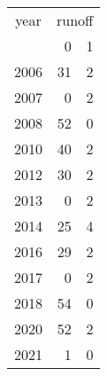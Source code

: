 \footnotesize\begin{tabular}[t]{lrr}
\toprule
\multicolumn{1}{c}{year} & \multicolumn{2}{c}{runoff} \\
\cmidrule(l{3pt}r{3pt}){1-1} \cmidrule(l{3pt}r{3pt}){2-3}
  & 0 & 1\\
\midrule
2006 & 31 & 2\\
2007 & 0 & 2\\
2008 & 52 & 0\\
2010 & 40 & 2\\
2012 & 30 & 2\\
2013 & 0 & 2\\
2014 & 25 & 4\\
2016 & 29 & 2\\
2017 & 0 & 2\\
2018 & 54 & 0\\
2020 & 52 & 2\\
2021 & 1 & 0\\
\bottomrule
\end{tabular}
